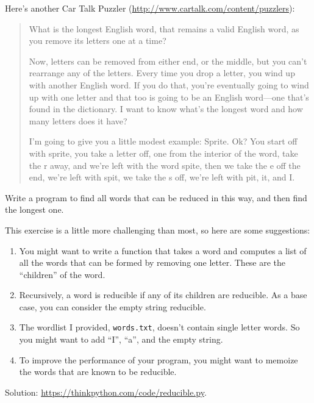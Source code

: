 \documentclass[10pt]{book}
\begin{document}
\begin{exercise}

Here's another Car Talk Puzzler
(\url{http://www.cartalk.com/content/puzzlers}):

\begin{quote}
What is the longest English word, that remains a valid English word,
as you remove its letters one at a time?

Now, letters can be removed from either end, or the middle, but you
can't rearrange any of the letters. Every time you drop a letter, you
wind up with another English word. If you do that, you're eventually
going to wind up with one letter and that too is going to be an
English word---one that's found in the dictionary. I want to know
what's the longest word and how many letters does it
have?

I'm going to give you a little modest example: Sprite. Ok? You start
off with sprite, you take a letter off, one from the interior of the
word, take the r away, and we're left with the word spite, then we
take the e off the end, we're left with spit, we take the s off, we're
left with pit, it, and I.
\end{quote}

Write a program to find all words that can be reduced in this way,
and then find the longest one.

This exercise is a little more challenging than most, so here are
some suggestions:

\begin{enumerate}

\item You might want to write a function that takes a word and
  computes a list of all the words that can be formed by removing one
  letter.  These are the ``children'' of the word.

\item Recursively, a word is reducible if any of its children
are reducible.  As a base case, you can consider the empty
string reducible.

\item The wordlist I provided, {\tt words.txt}, doesn't
contain single letter words.  So you might want to add
``I'', ``a'', and the empty string.

\item To improve the performance of your program, you might want
to memoize the words that are known to be reducible.

\end{enumerate}

Solution: \url{https://thinkpython.com/code/reducible.py}.

\end{exercise}
\end{document}
